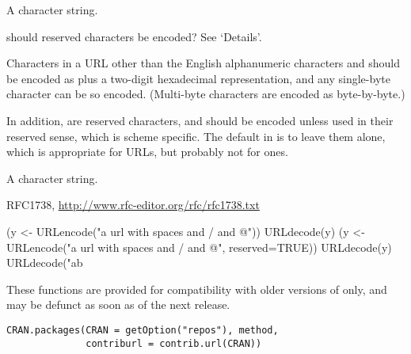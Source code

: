 %
\begin{Arguments}
\begin{ldescription}
\item[\code{URL}] A character string.
\item[\code{reserved}] should reserved characters be encoded?  See
`Details'.
\end{ldescription}
\end{Arguments}
%
\begin{Details}\relax
Characters in a URL other than the English alphanumeric characters and
 should be encoded as \code{\%}
plus a two-digit hexadecimal representation, and any single-byte
character can be so encoded. (Multi-byte characters are encoded as
byte-by-byte.)

In addition,  are reserved characters, and should
be encoded unless used in their reserved sense, which is scheme
specific.  The default in  is to leave them alone, which
is appropriate for  URLs, but probably not for
 ones.
\end{Details}
%
\begin{Value}
A character string.
\end{Value}
%
\begin{References}\relax
RFC1738, \url{http://www.rfc-editor.org/rfc/rfc1738.txt}
\end{References}
%
\begin{Examples}
\begin{ExampleCode}
(y <- URLencode("a url with spaces and / and @"))
URLdecode(y)
(y <- URLencode("a url with spaces and / and @", reserved=TRUE))
URLdecode(y)
URLdecode("ab%
\end{ExampleCode}
\end{Examples}
%
\begin{Description}\relax
These functions are provided for compatibility with older versions of
\R{} only, and may be defunct as soon as of the next release.
\end{Description}
%
\begin{Usage}
\begin{verbatim}
CRAN.packages(CRAN = getOption("repos"), method,
              contriburl = contrib.url(CRAN))

\end{verbatim}
\end{Usage}
